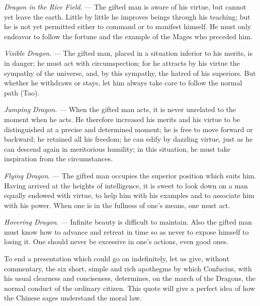 \emph{Dragon in the Rice Field}. --- The gifted man is aware of his virtue, but cannot yet leave the earth. Little by little he improves beings through his teaching; but he is not yet permitted either to command or to manifest himself. He must only endeavor to follow the fortune and the example of the Mages who preceded him.

\emph{Visible Dragon}. --- The gifted man, placed in a situation inferior to his merits, is in danger; he must act with circumspection; for he attracts by his virtue the sympathy of the universe, and, by this sympathy, the hatred of his superiors. But whether he withdraws or stays, let him always take care to follow the normal path (Tao).

\emph{Jumping Dragon}. --- When the gifted man acts, it is never unrelated to the moment when he acts. He therefore increased his merits and his virtue to be distinguished at a precise and determined moment; he is free to move forward or backward; he retained all his freedom; he can edify by dazzling virtue, just as he can descend again in meritorious humility; in this situation, he must take inspiration from the circumstances.

\emph{Flying Dragon}. --- The gifted man occupies the superior position which suits him. Having arrived at the heights of intelligence, it is sweet to look down on a man equally endowed with virtue, to help him with his examples and to associate him with his power. When one is in the fullness of one's means, one must act.

\emph{Hovering Dragon}. --- Infinite beauty is difficult to maintain. Also the gifted man must know how to advance and retreat in time so as never to expose himself to losing it. One should never be excessive in one's actions, even good ones.

To end a presentation which could go on indefinitely, let us give, without commentary, the six short, simple and rich apothegms by which Confucius, with his usual clearness and conciseness, determines, on the march of the Dragons, the normal conduct of the ordinary citizen. This quote will give a perfect idea of how the Chinese sages understand the moral law.

